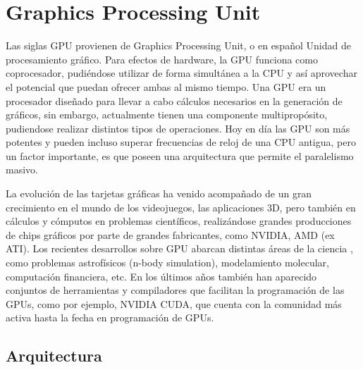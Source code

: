 \section{Graphics Processing Unit}

Las siglas GPU provienen de Graphics Processing Unit, o en español Unidad de
procesamiento gráfico. Para efectos de hardware, la GPU funciona como
coprocesador, pudiéndose utilizar de forma simultánea a la CPU y así aprovechar
el potencial que puedan ofrecer ambas al mismo tiempo.  Una GPU era un
procesador diseñado para llevar a cabo cálculos necesarios en la generación de
gráficos, sin embargo, actualmente tienen una componente multipropósito,
pudiendose realizar distintos tipos de operaciones. Hoy en día las GPU son más
potentes y pueden incluso superar frecuencias de reloj de una CPU antigua, pero
un factor importante, es que poseen una arquitectura que permite el paralelismo
masivo.

La evolución de las tarjetas gráficas ha venido acompañado de un gran
crecimiento en el mundo de los videojuegos, las aplicaciones 3D, pero también
en cálculos y cómputos en problemas científicos, realizándose
grandes producciones de chips gráficos por parte de grandes fabricantes, como
NVIDIA, AMD (ex ATI). Los recientes desarrollos sobre GPU abarcan distintas
áreas de la ciencia \cite{kirk2010programming}, como problemas astrofísicos
(n-body simulation), modelamiento molecular, computación financiera, etc. En
los últimos años también han aparecido conjuntos de herramientas y compiladores
que facilitan la programación de las GPUs, como por ejemplo, NVIDIA CUDA, que
cuenta con la comunidad más activa hasta la fecha en programación de GPUs.

\subsection{Arquitectura}




